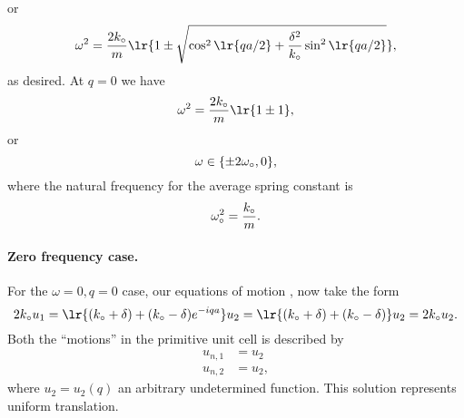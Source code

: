 {%
%
or
\begin{dmath}\label{eqn:condensedMatterProblemSet4Problem2:280}
\omega^2 =
\frac{2 k_\nought }{m} \lr{ 1
\pm
\sqrt{
\cos^2 \lr{ q a /2 }
+
\frac{\delta^2}{k_\nought} \sin^2 \lr{ q a /2 }
}
},
\end{dmath}
%
as desired.
At \(q = 0\) we have
%
\begin{dmath}\label{eqn:condensedMatterProblemSet4Problem2:400}
\omega^2 = \frac{2 k_\nought }{m} \lr{ 1 \pm 1 },
\end{dmath}
%
or
\begin{dmath}\label{eqn:condensedMatterProblemSet4Problem2:420}
\omega \in \{ \pm 2 \omega_\nought, 0 \},
\end{dmath}
%
where the natural frequency for the average spring constant is
%
\begin{dmath}\label{eqn:condensedMatterProblemSet4Problem2:580}
\omega_\nought^2 = \frac{k_\nought}{m}.
\end{dmath}
%
\paragraph{Zero frequency case.}
%
For the \(\omega = 0, q = 0\) case, our equations of motion
, now take the form
%
\begin{dmath}\label{eqn:condensedMatterProblemSet4Problem2:440}
2 k_\nought u_1
=
\lr{
 (k_\nought + \delta)
+ (k_\nought - \delta)
e^{ -i q a }
}
u_2
=
\lr{
 (k_\nought + \delta)
+ (k_\nought - \delta)
}
u_2
=
2 k_\nought u_2.
\end{dmath}
%
Both the ``motions'' in the primitive unit cell is described by
%
\begin{dmath}\label{eqn:condensedMatterProblemSet4Problem2:620}
\begin{aligned}
u_{n, 1} &= u_2 \\
u_{n, 2} &= u_2,
\end{aligned}
\end{dmath}
%
where \(u_2 = u_2(q)\) an arbitrary undetermined function.  This solution represents uniform translation.

%
%
%
%
%
}
